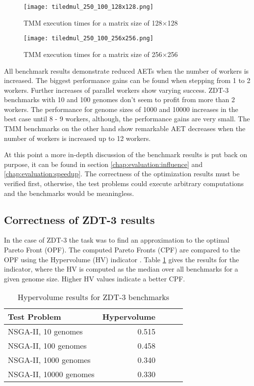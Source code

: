 \begin{figure}
  \centering
  \texttt{[image: tiledmul\_250\_100\_128x128.png]}
  \caption[TMM execution times for a matrix size of 128$\times$128]{TMM execution times for a matrix size of 128$\times$128}
  \label{fig:tiledmul_250_100_128x128}
\end{figure}
\begin{figure}
  \centering
  \texttt{[image: tiledmul\_250\_100\_256x256.png]}
  \caption[TMM execution times for a matrix size of 256$\times$256]{TMM execution times for a matrix size of 256$\times$256}
  \label{fig:tiledmul_250_100_256x256}
\end{figure}

All benchmark results demonstrate reduced AETs when the number of workers is increased. The biggest performance gains can be found when stepping from 1 to 2 workers. Further increases of parallel workers show varying success. ZDT-3 benchmarks with 10 and 100 genomes don't seem to profit from more than 2 workers. The performance for genome sizes of 1000 and 10000 increases in the best case until 8 - 9 workers, although, the performance gains are very small. The TMM benchmarks on the other hand show remarkable AET decreases when the number of workers is increased up to 12 workers.

At this point a more in-depth discussion of the benchmark results is put back on purpose, it can be found in section \ref{chap:evaluation:influence} and \ref{chap:evaluation:speedup}. The correctness of the optimization results must be verified first, otherwise, the test problems could execute arbitrary computations and the benchmarks would be meaningless.

\subsection{Correctness of ZDT-3 results}
In the case of ZDT-3 the task was to find an approximation to the optimal Pareto Front (OPF). The computed Pareto Fronts (CPF) are compared to the OPF using the Hypervolume (HV) indicator \cite{zitzler1999multiobjective}. Table \ref{table:hypervolume} gives the results for the indicator, where the HV is computed as the median over all benchmarks for a given genome size. Higher HV values indicate a better CPF.

\begin{table}
  \centering
  \caption{Hypervolume results for ZDT-3 benchmarks}
  \begin{tabular}{lrrrr}\toprule[2pt]
    Test Problem & Hypervolume \\ \midrule
    NSGA-II, 10 genomes & 0.515 \\
    NSGA-II, 100 genomes & 0.458 \\
    NSGA-II, 1000 genomes & 0.340 \\
    NSGA-II, 10000 genomes & 0.330 \\
  \end{tabular}
  \label{table:hypervolume}
\end{table}

